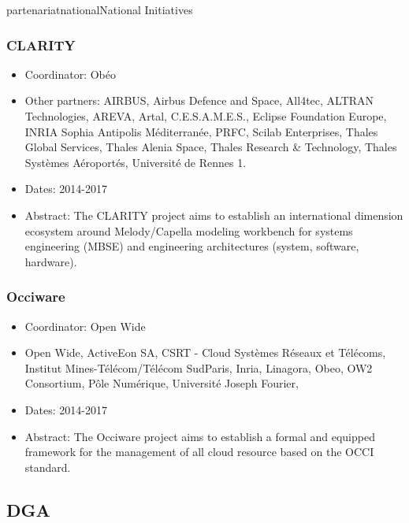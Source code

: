 \documentclass{ra2018}
\begin{document}
\begin{module}{partenariat}{national}{National Initiatives}

\subsubsection*{\label{project:clarity}CLARITY}
\begin{itemize}
	\item Coordinator: Obéo
	\item Other partners:  AIRBUS, Airbus Defence and Space, All4tec, ALTRAN Technologies, AREVA, Artal, C.E.S.A.M.E.S., Eclipse Foundation Europe, INRIA Sophia Antipolis Méditerranée, PRFC, Scilab Enterprises, Thales Global Services, Thales Alenia Space, Thales Research \& Technology, Thales Systèmes Aéroportés, Université de Rennes 1.
	\item Dates: 2014-2017
	\item Abstract: The CLARITY project aims to establish an international dimension ecosystem around Melody/Capella modeling workbench for systems engineering (MBSE) and engineering architectures (system, software, hardware).
\end{itemize}

\subsubsection*{\label{project:occiware}Occiware}
\begin{itemize}
	\item Coordinator: Open Wide
	\item Open Wide, ActiveEon SA, CSRT - Cloud  Systèmes Réseaux et Télécoms, Institut Mines-Télécom/Télécom SudParis, Inria, Linagora, Obeo, OW2 Consortium, Pôle Numérique, Université Joseph Fourier, 
	\item Dates: 2014-2017
	\item Abstract: The Occiware project aims to establish a formal and equipped framework for the management of all cloud resource based on the OCCI standard. 
\end{itemize}




\subsection{DGA}



\end{module}
\end{document}
